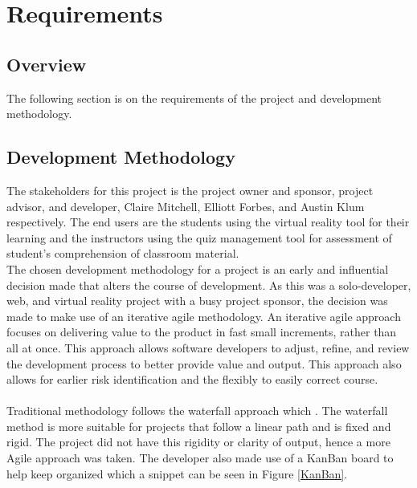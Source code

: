 \section{Requirements}
\label{sec:Requirements}

\subsection{Overview} 
The following section is on the requirements of the project and development methodology. 

\subsection{Development Methodology}
The stakeholders for this project is the project owner and sponsor, project advisor, and developer, Claire Mitchell, Elliott Forbes, and Austin Klum respectively. The end users are the students using the virtual reality tool for their learning and the instructors using the quiz management tool for assessment of student's comprehension of classroom material.
\\
The chosen development methodology for a project is an early and influential decision made that alters the course of development. As this was a solo-developer, web, and virtual reality project with a busy project sponsor, the decision was made to make use of an iterative agile methodology. An iterative agile approach focuses on delivering value to the product in fast small increments, rather than all at once. This approach allows software developers to adjust, refine, and review the development process to better provide value and output. This approach also allows for earlier risk identification and the flexibly to easily correct course.\\
\\
Traditional methodology follows the waterfall approach which . The waterfall method is more suitable for projects that follow a linear path and is fixed and rigid. The project did not have this rigidity or clarity of output, hence a more Agile approach was taken. The developer also made use of a KanBan board to help keep organized which a snippet can be seen in Figure \ref{KanBan}. 

